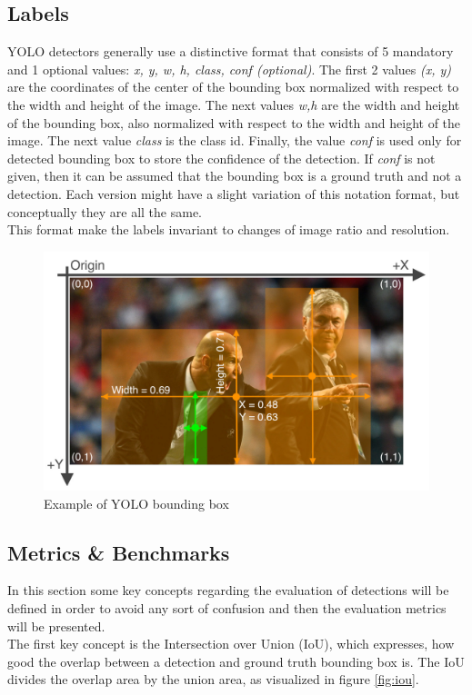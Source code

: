 \subsection{Labels}
YOLO detectors generally use a distinctive format that consists of 5 mandatory and 1 optional values: \textit{x, y, w, h, class, conf (optional)}. The first 2 values \textit{(x, y)} are the coordinates of the center of the bounding box normalized with respect to the width and height of the image. The next values \textit{w,h} are the width and height of the bounding box, also normalized with respect to the width and height of the image. The next value \textit{class} is the class id. Finally, the value \textit{conf} is used only for detected bounding box to store the confidence of the detection. If \textit{conf} is not given, then it can be assumed that the bounding box is a ground truth and not a detection. Each version might have a slight variation of this notation format, but conceptually they are all the same. \\
This format make the labels invariant to changes of image ratio and resolution.


\begin{figure}[!h]
  \includegraphics[width=\textwidth]{images/yolo_images/yolo_labels_zidane}
  \centering
  \caption{Example of YOLO bounding box \cite{yolov5_train_custom}}
\end{figure}

\subsection{Metrics \& Benchmarks}
In this section some key concepts regarding the evaluation of detections will be defined in order to avoid any sort of confusion and then the evaluation metrics will be presented. \\
The first key concept is the Intersection over Union (IoU), which expresses, how good the overlap between a detection and ground truth bounding box is. The IoU divides the overlap area by the union area, as visualized in figure \ref{fig:iou}.

